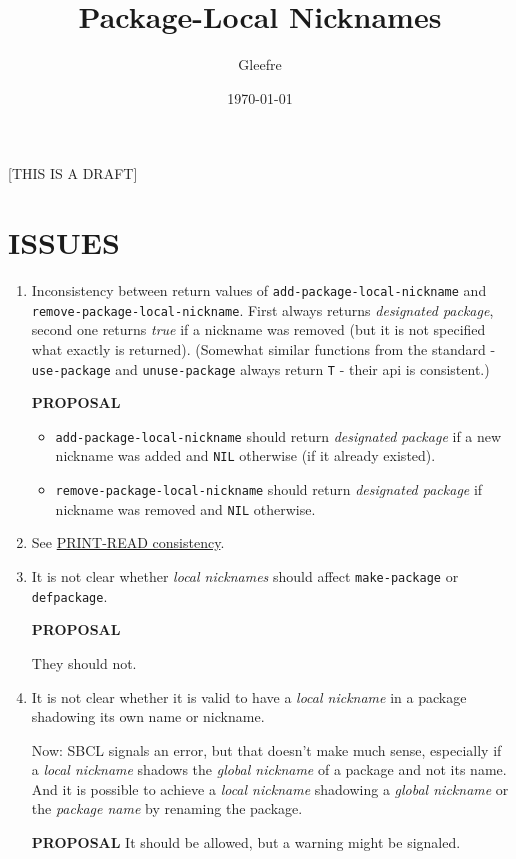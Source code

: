 \documentclass[11pt]{article}
\author{Gleefre}
\date{\today}
\title{Package-Local Nicknames}
\begin{document}
\maketitle
\tableofcontents

[THIS IS A DRAFT]

\section{ISSUES}
\label{sec:org2a5baa8}
\begin{enumerate}
\item Inconsistency between return values of \texttt{add-package-local-nickname} and
\texttt{remove-package-local-nickname}. First always returns \emph{designated package},
second one returns \emph{true} if a nickname was removed (but it is not
specified what exactly is returned). (Somewhat similar functions from the
standard - \texttt{use-package} and \texttt{unuse-package} always return \texttt{T} - their api
is consistent.)

\textbf{PROPOSAL}
\begin{itemize}
\item \texttt{add-package-local-nickname} should return \emph{designated package} if a new
nickname was added and \texttt{NIL} otherwise (if it already existed).
\item \texttt{remove-package-local-nickname} should return \emph{designated package} if
nickname was removed and \texttt{NIL} otherwise.
\end{itemize}
\item See \hyperref[sec:orga0db5bb]{PRINT-READ consistency}.
\item It is not clear whether \emph{local nicknames} should affect \texttt{make-package} or
\texttt{defpackage}.

\textbf{PROPOSAL}

They should not.
\item It is not clear whether it is valid to have a \emph{local nickname} in a package
shadowing its own name or nickname.

Now: SBCL signals an error, but that doesn't make much sense, especially if
a \emph{local nickname} shadows the \emph{global nickname} of a package and not its
name. And it is possible to achieve a \emph{local nickname} shadowing a \emph{global
nickname} or the \emph{package name} by renaming the package.

\textbf{PROPOSAL}
It should be allowed, but a warning might be signaled.
\end{enumerate}
\end{document}
